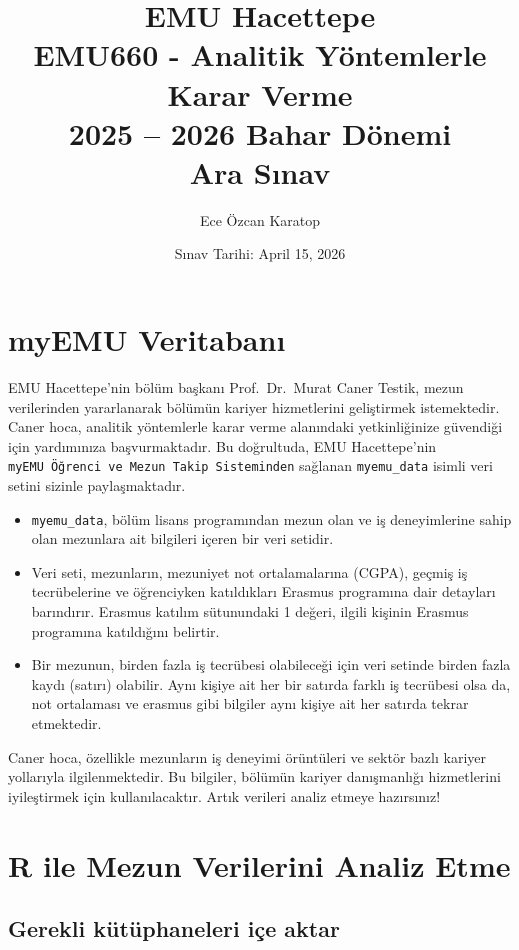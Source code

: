 \documentclass[
  11pt,
  a4paper,
  DIV=11,
  numbers=noendperiod]{scrartcl}
\title{EMU Hacettepe\\
EMU660 - Analitik Yöntemlerle Karar Verme\\
2025 -- 2026 Bahar Dönemi\\
Ara Sınav}
\author{Ece Özcan Karatop}
\date{Sınav Tarihi: April 15, 2026}
\begin{document}
\maketitle


\section{myEMU Veritabanı}\label{myemu-veritabanux131}

EMU Hacettepe'nin bölüm başkanı Prof.~Dr.~Murat Caner Testik, mezun
verilerinden yararlanarak bölümün kariyer hizmetlerini geliştirmek
istemektedir. Caner hoca, analitik yöntemlerle karar verme alanındaki
yetkinliğinize güvendiği için yardımınıza başvurmaktadır. Bu doğrultuda,
EMU Hacettepe'nin \texttt{myEMU\ Öğrenci\ ve\ Mezun\ Takip\ Sisteminden}
sağlanan \texttt{myemu\_data} isimli veri setini sizinle paylaşmaktadır.

\begin{itemize}
\item
  \texttt{myemu\_data}, bölüm lisans programından mezun olan ve iş
  deneyimlerine sahip olan mezunlara ait bilgileri içeren bir veri
  setidir.
\item
  Veri seti, mezunların, mezuniyet not ortalamalarına (CGPA), geçmiş iş
  tecrübelerine ve öğrenciyken katıldıkları Erasmus programına dair
  detayları barındırır. Erasmus katılım sütunundaki 1 değeri, ilgili
  kişinin Erasmus programına katıldığını belirtir.
\item
  Bir mezunun, birden fazla iş tecrübesi olabileceği için veri setinde
  birden fazla kaydı (satırı) olabilir. Aynı kişiye ait her bir satırda
  farklı iş tecrübesi olsa da, not ortalaması ve erasmus gibi bilgiler
  aynı kişiye ait her satırda tekrar etmektedir.
\end{itemize}

Caner hoca, özellikle mezunların iş deneyimi örüntüleri ve sektör bazlı
kariyer yollarıyla ilgilenmektedir. Bu bilgiler, bölümün kariyer
danışmanlığı hizmetlerini iyileştirmek için kullanılacaktır. Artık
verileri analiz etmeye hazırsınız!

\section{R ile Mezun Verilerini Analiz
Etme}\label{r-ile-mezun-verilerini-analiz-etme}

\subsection*{Gerekli kütüphaneleri içe
aktar}\label{gerekli-kuxfctuxfcphaneleri-iuxe7e-aktar}
\end{document}
